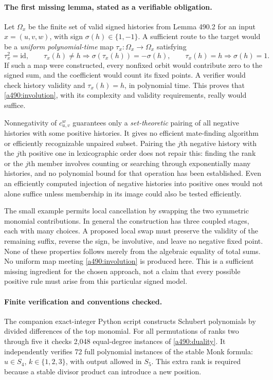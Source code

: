 \documentclass[11pt]{article}
\begin{document}
\paragraph{The first missing lemma, stated as a verifiable obligation.}
Let $\Omega_x$ be the finite set of valid signed histories from Lemma 490.2
for an input $x=(u,v,w)$, with sign $\sigma(h)\in\{1,-1\}$. A
sufficient route to the target would be a \emph{uniform polynomial-time}
map $\tau_x:\Omega_x\to\Omega_x$ satisfying
\begin{equation}\label{a490:involution}
 \tau_x^2=\mathrm{id},\qquad
 \tau_x(h)\ne h\Longrightarrow
       \sigma(\tau_x(h))=-\sigma(h),\qquad
 \tau_x(h)=h\Longrightarrow\sigma(h)=1.
\end{equation}
If such a map were constructed, every nonfixed orbit would contribute
zero to the signed sum, and the coefficient would count its fixed points.
A verifier would check history validity and $\tau_x(h)=h$, in polynomial
time. This proves that \eqref{a490:involution}, with its complexity and
validity requirements, really would suffice.

Nonnegativity of $c_{u,v}^w$ guarantees only a \emph{set-theoretic}
pairing of all negative histories with some positive histories. It gives
no efficient mate-finding algorithm or efficiently recognizable unpaired
subset. Pairing the $j$th negative history with the $j$th positive one
in lexicographic order does not repair this: finding the rank or the
$j$th member involves counting or searching through exponentially many
histories, and no polynomial bound for that operation has been established.
Even an efficiently computed injection of negative histories into positive
ones would not alone suffice unless membership in its image could also
be tested efficiently.

The small example permits local cancellation by swapping the two symmetric
monomial contributions. In general the construction has three coupled
stages, each with many choices. A proposed local swap must preserve the
validity of the remaining suffix, reverse the sign, be involutive, and
leave no negative fixed point. None of these properties follows merely
from the algebraic equality of total sums. No uniform map meeting
\eqref{a490:involution} is produced here. This is a sufficient missing
ingredient for the chosen approach, not a claim that every possible
positive rule must arise from this particular signed model.

\paragraph{Finite verification and conventions checked.}
The companion exact-integer Python script constructs Schubert polynomials
by divided differences of the top monomial. For all permutations of ranks
two through five it checks 2,048 equal-degree instances of
\eqref{a490:duality}. It independently verifies 72 full polynomial
instances of the stable Monk formula: $u\in S_4$, $k\in\{1,2,3\}$,
with output allowed in $S_5$. This extra rank is required because a
stable divisor product can introduce a new position.
\end{document}
